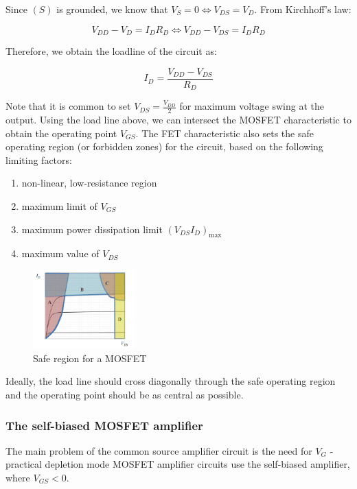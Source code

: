 \documentclass{article}
\begin{document}
Since $(S)$ is grounded, we know that $V_S = 0 \iff V_{DS} = V_D$. From Kirchhoff's law:

\[ V_{DD} - V_D = I_DR_D \iff V_{DD} - V_{DS} = I_DR_D \]

Therefore, we obtain the loadline of the circuit as:

\[ I_D = \frac{V_{DD} - V_{DS}}{R_D} \]

Note that it is common to set $V_{DS} = \frac{V_{DD}}{2}$ for maximum voltage swing at the output. Using the load line above, we can intersect the MOSFET characteristic to obtain the operating point $V_{GS}$. The FET characteristic also sets the safe operating region (or forbidden zones) for the circuit, based on the following limiting factors:

\begin{enumerate}
    \item non-linear, low-resistance region
    \item maximum limit of $V_{GS}$
    \item maximum power dissipation limit $(V_{DS}I_D)_{\text{max}}$
    \item maximum value of $V_{DS}$
\end{enumerate}

\begin{figure}[h]
    \centering
    \includegraphics[width = 0.35\textwidth]{images/fet5.png}
    \caption{Safe region for a MOSFET}
    \label{fig:fet5}
\end{figure}

Ideally, the load line should cross diagonally through the safe operating region and the operating point should be as central as possible.

\subsubsection{The self-biased MOSFET amplifier}

The main problem of the common source amplifier circuit is the need for $V_G$ - practical depletion mode MOSFET amplifier circuits use the self-biased amplifier, where $V_{GS} < 0$.
\end{document}
